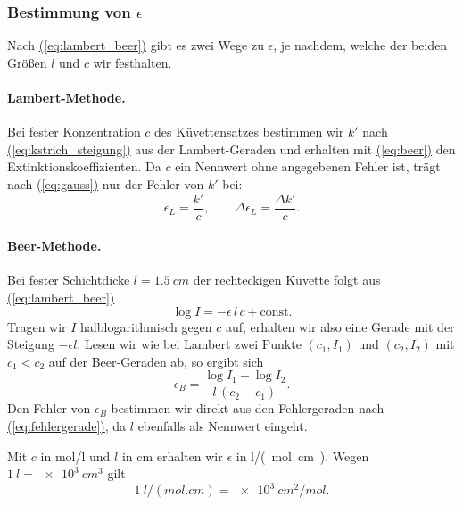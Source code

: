 \documentclass{article}
\let\OrigRef\ref
\renewcommand{\ref}[1]{{\color{linkblue}\uline{\OrigRef{#1}}}}
\renewcommand{\eqref}[1]{{\color{linkblue}\uline{\textup{(\OrigRef{#1})}}}}
\begin{document}
\subsubsection{Bestimmung von \texorpdfstring{$\epsilon$}{epsilon}}
\label{sec:epsilon}

Nach \eqref{eq:lambert_beer} gibt es zwei Wege zu $\epsilon$, je nachdem, welche der
beiden Größen $l$ und $c$ wir festhalten.

\paragraph{Lambert-Methode.} Bei fester Konzentration $c$ des Küvettensatzes bestimmen wir
$k'$ nach \eqref{eq:kstrich_steigung} aus der Lambert-Geraden und erhalten mit
\eqref{eq:beer} den Extinktionskoeffizienten. Da $c$ ein Nennwert ohne angegebenen Fehler
ist, trägt nach \eqref{eq:gauss} nur der Fehler von $k'$ bei:
\begin{equation}
	\epsilon_L = \frac{k'}{c} ,
	\qquad
	\Delta\epsilon_L = \frac{\Delta k'}{c} .
	\label{eq:epsilon_lambert}
\end{equation}

\paragraph{Beer-Methode.} Bei fester Schichtdicke $l = \qty{1,5}{cm}$ der rechteckigen
Küvette folgt aus \eqref{eq:lambert_beer}
\begin{equation}
	\log I = -\epsilon\,l\,c + \text{const} .
	\label{eq:beer_log}
\end{equation}
Tragen wir $I$ halblogarithmisch gegen $c$ auf, erhalten wir also eine Gerade mit der
Steigung $-\epsilon l$. Lesen wir wie bei Lambert zwei Punkte $(c_1, I_1)$ und
$(c_2, I_2)$ mit $c_1 < c_2$ auf der Beer-Geraden ab, so ergibt sich
\begin{equation}
	\epsilon_B = \frac{\log I_1 - \log I_2}{l\,(c_2 - c_1)} .
	\label{eq:epsilon_beer}
\end{equation}
Den Fehler von $\epsilon_B$ bestimmen wir direkt aus den Fehlergeraden nach
\eqref{eq:fehlergerade}, da $l$ ebenfalls als Nennwert eingeht.

Mit $c$ in \si{mol/l} und $l$ in \si{cm} erhalten wir $\epsilon$ in \si{l/(mol.cm)}.
Wegen $\qty{1}{l} = \qty{e3}{cm^3}$ gilt
\begin{equation}
	\qty{1}{l/(mol.cm)} = \qty{e3}{cm^2/mol} .
	\label{eq:einheit}
\end{equation}
\end{document}
